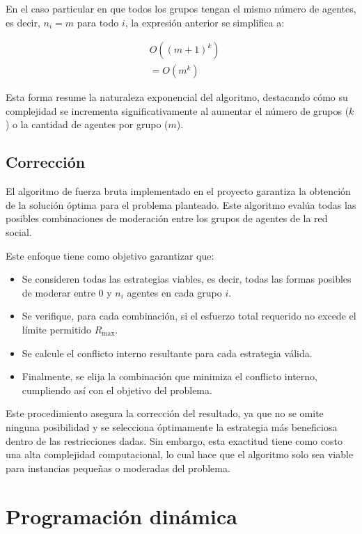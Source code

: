 En el caso particular en que todos los grupos tengan el mismo número de agentes, es decir, $n_i = m$ para todo $i$, la expresión anterior se simplifica a:

\begin{align}
	& O \left((m + 1)^k \right ) \\
	& = O(m^k)
\end{align}

Esta forma resume la naturaleza exponencial del algoritmo, destacando cómo su complejidad se incrementa significativamente al aumentar el número de grupos ($k$) o la cantidad de agentes por grupo ($m$).

\subsection{Corrección}

El algoritmo de fuerza bruta implementado en el proyecto garantiza la obtención de la solución óptima para el problema planteado. Este algoritmo evalúa todas las posibles combinaciones de moderación entre los grupos de agentes de la red social.

Este enfoque tiene como objetivo garantizar que:

\begin{itemize}
	\item Se consideren todas las estrategias viables, es decir, todas las formas posibles de moderar entre $0$ y $n_i$ agentes en cada grupo $i$.

	\item Se verifique, para cada combinación, si el esfuerzo total requerido no excede el límite permitido $R_{ \max }$.

	\item Se calcule el conflicto interno resultante para cada estrategia válida.

	\item Finalmente, se elija la combinación que minimiza el conflicto interno, cumpliendo así con el objetivo del problema.
\end{itemize}

Este procedimiento asegura la corrección del resultado, ya que no se omite ninguna posibilidad y se selecciona óptimamente la estrategia más beneficiosa dentro de las restricciones dadas. Sin embargo, esta exactitud tiene como costo una alta complejidad computacional, lo cual hace que el algoritmo solo sea viable para instancias pequeñas o moderadas del problema.

\section{Programación dinámica}

